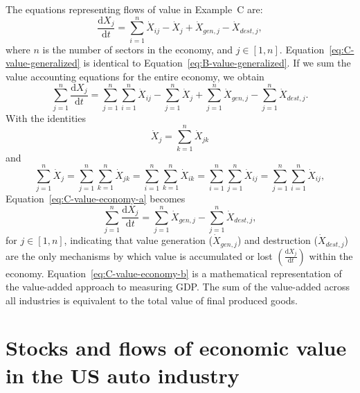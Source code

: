 The equations representing flows of value in Example~C are:
%
\begin{equation}\label{eq:C-value-generalized}
	\frac{\mathrm{d}X_{j}}{\mathrm{d}t}
	= \sum\limits_{i=1}^{n} \dot{X}_{ij}
	- \dot{X}_{j}
	+ \dot{X}_{gen,j}
	- \dot{X}_{dest,j},
\end{equation}
%
where $n$ is the number of sectors in the economy, and $j \in [1, n]$.
Equation~\ref{eq:C-value-generalized} is identical to Equation~\ref{eq:B-value-generalized}.
If we sum the value accounting equations for the entire economy, 
we obtain
%
\begin{equation}\label{eq:C-value-economy-a}
	\sum\limits_{j=1}^{n} \frac{\mathrm{d}X_{j}}{\mathrm{d}t}
	= \sum\limits_{j=1}^{n} \sum\limits_{i=1}^{n} \dot{X}_{ij}
	- \sum\limits_{j=1}^{n} \dot{X}_{j}
	+ \sum\limits_{j=1}^{n} \dot{X}_{gen,j}
	- \sum\limits_{j=1}^{n} \dot{X}_{dest,j}.
\end{equation}
%
With the identities
%
\begin{equation} \label{eq:X_identity_1}
	\dot{X}_{j}  
	= \sum\limits_{k=1}^n \dot{X}_{jk}
\end{equation}
%
and
%
\begin{equation} \label{eq:X_identity_2}
	\sum\limits_{j=1}^n\dot{X}_{j}  
	= \sum\limits_{j=1}^n \sum\limits_{k=1}^n \dot{X}_{jk}
	= \sum\limits_{i=1}^n \sum\limits_{k=1}^n \dot{X}_{ik}
	= \sum\limits_{i=1}^n \sum\limits_{j=1}^n \dot{X}_{ij}
	= \sum\limits_{j=1}^n \sum\limits_{i=1}^n \dot{X}_{ij},
\end{equation}
%
Equation~\ref{eq:C-value-economy-a} becomes
%
\begin{equation}\label{eq:C-value-economy-b}
	\sum\limits_{j=1}^{n} \frac{\mathrm{d}X_{j}}{\mathrm{d}t}
	= \sum\limits_{j=1}^{n} \dot{X}_{gen,j}
	- \sum\limits_{j=1}^{n} \dot{X}_{dest,j},
\end{equation}
%
for $j \in [1, n]$, indicating that 
value generation ($\dot{X}_{gen,j}$) 
and destruction ($\dot{X}_{dest,j}$)
are the only mechanisms by which value is accumulated or lost
$\left( \frac{\mathrm{d}X_{j}}{\mathrm{d}t} \right)$
within the economy.  
Equation~\ref{eq:C-value-economy-b} is a mathematical representation of the
value-added approach to measuring GDP\@. The sum of the
value-added across all industries is equivalent to the 
total value of final produced goods.\cite[p.~196]{Landefeld:2008aa}


\section{Stocks and flows of economic value in the US auto industry}
\label{sec:value_auto}

